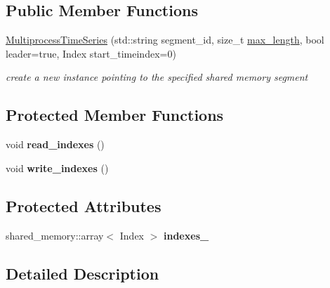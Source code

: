 \subsection*{Public Member Functions}
\begin{DoxyCompactItemize}
\item 
\hyperlink{classtime__series_1_1MultiprocessTimeSeries_a118890497b42365a56221c66edbb478e}{Multiprocess\+Time\+Series} (std\+::string segment\+\_\+id, size\+\_\+t \hyperlink{classtime__series_1_1internal_1_1TimeSeriesBase_aee1bf636a094a3068f9de731688c3972}{max\+\_\+length}, bool leader=true, Index start\+\_\+timeindex=0)
\begin{DoxyCompactList}\small\item\em create a new instance pointing to the specified shared memory segment \end{DoxyCompactList}\end{DoxyCompactItemize}
\subsection*{Protected Member Functions}
\begin{DoxyCompactItemize}
\item 
\mbox{\label{classtime__series_1_1MultiprocessTimeSeries_a44445322f664019684a02caa31639c14}} 
void {\bfseries read\+\_\+indexes} ()
\item 
\mbox{\label{classtime__series_1_1MultiprocessTimeSeries_abc59736f908b8e3f4e6881607e2253a7}} 
void {\bfseries write\+\_\+indexes} ()
\end{DoxyCompactItemize}
\subsection*{Protected Attributes}
\begin{DoxyCompactItemize}
\item 
\mbox{\label{classtime__series_1_1MultiprocessTimeSeries_a0ae05ba33e9f73f839e2229677062518}} 
shared\+\_\+memory\+::array$<$ Index $>$ {\bfseries indexes\+\_\+}
\end{DoxyCompactItemize}


\subsection{Detailed Description}
